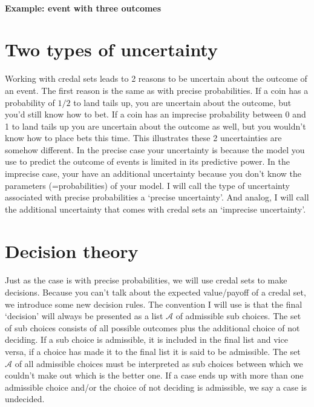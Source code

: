 \documentclass{report}
\theoremstyle{definition}
\begin{document}
\paragraph{Example: event with three outcomes}
	
	\section{Two types of uncertainty}
Working with credal sets leads to 2 reasons to be uncertain about the outcome of an event. The first reason is the same as with precise probabilities. If a coin has a probability of $1/2$ to land tails up, you are uncertain about the outcome, but you'd still know how to bet. If a coin has an imprecise probability between 0 and 1 to land tails up you are uncertain about the outcome as well, but you wouldn't know how to place bets this time. This illustrates these 2 uncertainties are somehow different. In the precise case your uncertainty is because the model you use to predict the outcome of events is limited in its predictive power. In the imprecise case, your have an additional uncertainty because you don't know the parameters (=probabilities) of your model. I will call the type of uncertainty associated with precise probabilities a \lq precise uncertainty'. And analog, I will call the additional uncertainty that comes with credal sets an \lq imprecise uncertainty'.


	\section{Decision theory}
\paragraph{}
Just as the case is with precise probabilities, we will use credal sets to make decisions. Because you can't talk about the expected value/payoff of a credal set, we introduce some new decision rules. The convention I will use is that the final \lq decision' will always be presented as a list $\mathcal{A}$ of admissible sub choices. The set of sub choices consists of all possible outcomes plus the additional choice of not deciding. If a sub choice is admissible, it is included in the final list and vice versa, if a choice has made it to the final list it is said to be admissible. The set $\mathcal{A}$ of all admissible choices must be interpreted as sub choices between which we couldn't make out which is the better one. If a case ends up with more than one admissible choice and/or the choice of not deciding is admissible, we say a case is undecided.
\end{document}
